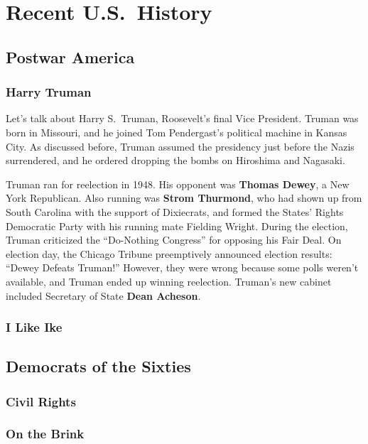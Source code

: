 \chapter{Recent U.S.\ History}

\section{Postwar America}

\subsection*{Harry Truman}

Let's talk about Harry S.\ Truman, Roosevelt's final Vice President.
Truman was born in Missouri, and he joined Tom Pendergast's political machine in Kansas City.
As discussed before, Truman assumed the presidency just before the Nazis surrendered,
and he ordered dropping the bombs on Hiroshima and Nagasaki.

Truman ran for reelection in 1948.
His opponent was \textbf{Thomas Dewey}, a New York Republican.
Also running was \textbf{Strom Thurmond}, who had shown up from South Carolina with the support of Dixiecrats,
and formed the States' Rights Democratic Party with his running mate Fielding Wright.
During the election, Truman criticized the ``Do-Nothing Congress'' for opposing his Fair Deal.
On election day, the Chicago Tribune preemptively announced election results: ``Dewey Defeats Truman!''
However, they were wrong because some polls weren't available, and Truman ended up winning reelection.
Truman's new cabinet included Secretary of State \textbf{Dean Acheson}.

\subsection*{I Like Ike}

\section{Democrats of the Sixties}

\subsection*{Civil Rights}

\subsection*{On the Brink}

